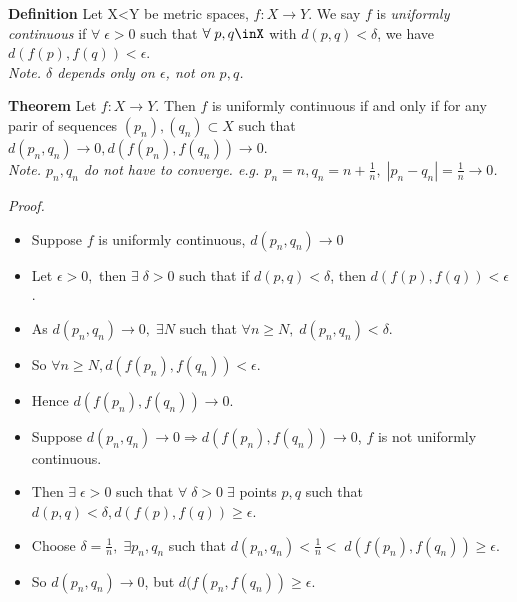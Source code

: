 \documentclass[12pt]{article}
\begin{document}
\begin{block}{\bf Definition} Let X<Y be metric spaces, $f: X\rightarrow Y$. We say $f$ is {\sl uniformly continuous} if $\forall\;\epsilon>0$ such that $\forall\;p,q\inX$ with $d(p,q)<\delta$, we have $d(f(p),f(q))<\epsilon.$\\
{\sl Note. $\delta$ depends only on $\epsilon$, not on $p,q$.}

\vspace{1.5\baselineskip}
\begin{block}{\bf Theorem} Let $f: X\rightarrow Y$. Then $f$ is uniformly continuous if and only if for any parir of sequences $(p_n), (q_n) \subset X$ such that $d(p_n, q_n)\rightarrow 0, d(f(p_n),f(q_n))\rightarrow 0$.\\
{\sl Note. $p_n,q_n$ do not have to converge. e.g. $p_n = n, q_n = n+\frac{1}{n},\; |p_n - q_n| = \frac{1}{n}\rightarrow 0$.}

\vspace{1.5\baselineskip}
{\sl Proof.}
\begin{itemize}
    \item Suppose $f$ is uniformly continuous, $d(p_n,q_n)\rightarrow 0$
    \item Let $\epsilon > 0,$ then $\exists\;\delta > 0$ such that if $d(p,q)<\delta$, then $d(f(p),f(q)) <\epsilon$.
    \item As $d(p_n,q_n) \rightarrow 0,\; \exists N$ such that $\forall n \ge N,\; d(p_n,q_n) < \delta$.
    \item So $\forall n\ge N, d(f(p_n),f(q_n)) <\epsilon$.
    \item Hence $d(f(p_n),f(q_n))\rightarrow 0$.\\
    
    \item Suppose $d(p_n,q_n)\rightarrow 0 \Rightarrow d(f(p_n),f(q_n))\rightarrow 0$, $f$ is not uniformly continuous.
    \item Then $\exists\;\epsilon>0$ such that $\forall\;\delta>0\;\exists$ points $p,q$ such that $d(p,q)<\delta, d(f(p),f(q)) \ge \epsilon$.
    \item Choose $\delta=\frac{1}{n}, \;\exists p_n,q_n$ such that $d(p_n,q_n) <\frac{1}{n}< \; d(f(p_n),f(q_n))\ge\epsilon$.
    \item So $d(p_n,q_n) \rightarrow 0$, but $d(f(p_n,f(q_n))\ge \epsilon$.
\end{itemize}
\end{block}

\end{block}
\end{document}
